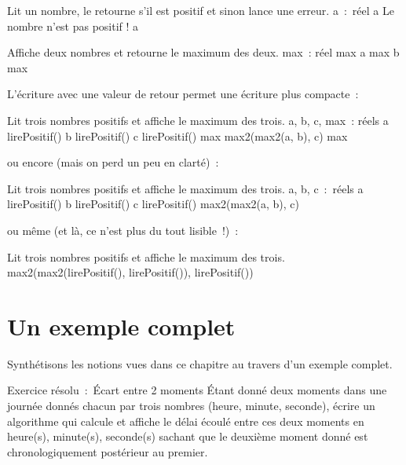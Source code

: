 	\begin{Pseudocode}
	\LComment Lit un nombre, le retourne s’il est positif et sinon lance une erreur.
		\Decl a~:~réel
		\Read a
			\Error Le nombre n’est pas positif !
		\EndIf
		\Return a
	\EndModule
	\end{Pseudocode}

	\begin{Pseudocode}
	\LComment Affiche deux nombres et retourne le maximum des deux.
	\Module{max2}{a\In, b\In~:~réels}{réel}
		\Decl max~: réel
		\If{a > b}
			\Let max \Gets a
		\Else
			\Let max \Gets b
		\EndIf
		\Return max
	\EndModule
	\end{Pseudocode}

	L’écriture avec une valeur de retour permet une
	écriture plus compacte~:

	\begin{Pseudocode}
	\LComment Lit trois nombres positifs et affiche le maximum des trois.
	\Module{max3}{}{}
		\Decl a, b, c, max~: réels
		\Let a \Gets lirePositif()
		\Let b \Gets lirePositif()
		\Let c \Gets lirePositif()
		\Let max  \Gets max2(max2(a, b), c)
		\Write max
	\EndModule
	\end{Pseudocode}

	ou encore (mais on perd un peu en clarté)~:

	\begin{Pseudocode}
	\LComment Lit trois nombres positifs et affiche le maximum des trois.
	\Module{max3}{}{}
		\Decl a, b, c~:~réels
		\Let a \Gets lirePositif()
		\Let b \Gets lirePositif()
		\Let c \Gets lirePositif()
		\Write max2(max2(a, b), c)
	\EndModule
	\end{Pseudocode}

	ou même (et là, ce n’est plus du tout lisible~!)~:

	\begin{Pseudocode}
	\LComment Lit trois nombres positifs et affiche le maximum des trois.
		\Write max2(max2(lirePositif(), lirePositif()), lirePositif())
	\EndModule
	\end{Pseudocode}

\section{Un exemple complet}

	Synthétisons les notions vues dans ce chapitre au travers
	d’un exemple complet.
	
	\begin{Emphase}[exercice]{Exercice résolu~:~Écart entre 2 moments}
		Étant donné deux moments dans une journée donnés chacun par trois
		nombres (heure, minute, seconde), écrire un algorithme qui calcule et
		affiche le délai écoulé entre ces deux moments en heure(s), minute(s),
		seconde(s) sachant que le deuxième moment donné est chronologiquement
		postérieur au premier.
	\end{Emphase}
	
